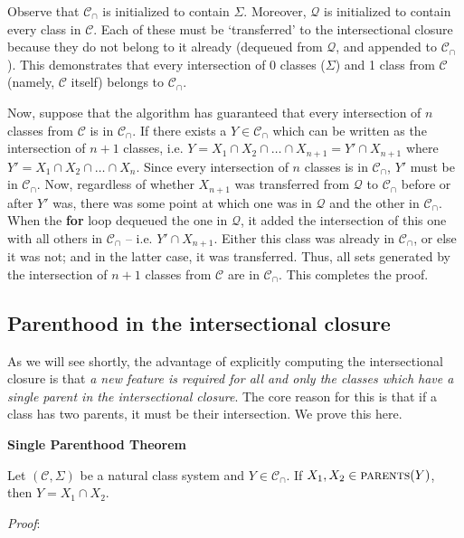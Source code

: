 \documentclass[11pt, oneside]{article}   	%
\begin{document}
Observe that $\mathcal C_\cap$ is initialized to contain $\Sigma$. Moreover, $\mathcal Q$ is initialized to contain every class in $\mathcal C$. Each of these must be `transferred' to the intersectional closure because they do not belong to it already (dequeued from $\mathcal Q$, and appended to $\mathcal C_\cap$). This demonstrates that every intersection of 0 classes ($\Sigma$) and 1 class from $\mathcal C$ (namely, $\mathcal C$ itself) belongs to $\mathcal C_\cap$.

Now, suppose that the algorithm has guaranteed that every intersection of $n$ classes from $\mathcal C$ is in $\mathcal C_\cap$. If there exists a $Y \in \mathcal C_\cap$ which can be written as the intersection of $n+1$ classes, i.e. $Y = X_1 \cap X_2 \cap \ldots \cap X_{n+1} = Y' \cap X_{n+1}$ where $Y' = X_1 \cap X_2 \cap \ldots \cap X_n$. Since every intersection of $n$ classes is in $\mathcal C_\cap$, $Y'$ must be in $\mathcal C_\cap$. Now, regardless of whether $X_{n+1}$ was transferred from $\mathcal Q$ to $\mathcal C_\cap$ before or after $Y'$ was, there was some point at which one was in $\mathcal Q$ and the other in $\mathcal C_\cap$. When the \textbf{for} loop dequeued the one in $\mathcal Q$, it added the intersection of this one with all others in $\mathcal C_\cap$ -- i.e. $Y' \cap X_{n+1}$. Either this class was already in $\mathcal C_\cap$, or else it was not; and in the latter case, it was transferred. Thus, all sets generated by the intersection of $n+1$ classes from $\mathcal C$ are in $\mathcal C_\cap$. This completes the proof.


\subsection{Parenthood in the intersectional closure}

As we will see shortly, the advantage of explicitly computing the intersectional closure is that \textit{a new feature is required for all and only the classes which have a single parent in the intersectional closure}. The core reason for this is that if a class has two parents, it must be their intersection. We prove this here.

\vspace{\baselineskip} \noindent \textbf{Single Parenthood Theorem}

Let $(\mathcal C, \Sigma)$ be a natural class system and $Y \in \mathcal C_\cap$. If $X_1, X_2 \in \textsc{parents}(Y)$, then $Y = X_1 \cap X_2$.

\vspace{\baselineskip} \noindent \textit{Proof}:
\end{document}
